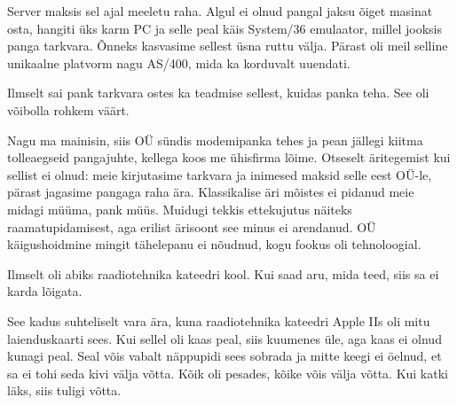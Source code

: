 
Server maksis sel ajal meeletu raha. Algul ei olnud pangal jaksu õiget masinat osta, hangiti üks karm 
PC ja selle peal käis System/36 emulaator, millel jooksis 
panga tarkvara. Õnneks kasvasime sellest üsna ruttu välja. Pärast oli meil selline unikaalne platvorm nagu
AS/400, mida ka korduvalt uuendati.

Ilmselt sai pank tarkvara ostes 
ka teadmise sellest, kuidas panka teha. See oli võibolla 
rohkem väärt.


Nagu ma mainisin, siis OÜ sündis modemipanka tehes ja pean jällegi kiitma 
tolleaegseid pangajuhte, kellega koos me ühisfirma lõime. Otseselt äritegemist kui sellist ei olnud: meie 
kirjutasime tarkvara ja inimesed maksid selle eest OÜ-le, pärast 
jagasime pangaga raha ära. Klassikalise äri mõistes ei pidanud meie midagi 
müüma, pank müüs. Muidugi tekkis ettekujutus näiteks
raamatupidamisest, aga erilist ärisoont see minus ei arendanud.
OÜ käigushoidmine mingit tähelepanu ei nõudnud, kogu fookus oli tehnoloogial.


Ilmselt oli abiks raadiotehnika kateedri kool. Kui saad aru, 
mida teed, siis sa ei karda lõigata.


See kadus suhteliselt vara ära, kuna raadiotehnika kateedri Apple 
IIs oli mitu laienduskaarti sees. Kui sellel oli
kaas peal, siis kuumenes üle, aga kaas ei olnud kunagi peal. Seal võis 
vabalt näppupidi sees sobrada ja mitte keegi ei öelnud, et sa ei tohi seda kivi 
välja võtta. Kõik oli pesades, kõike võis välja võtta. Kui katki läks, siis 
tuligi võtta. 

